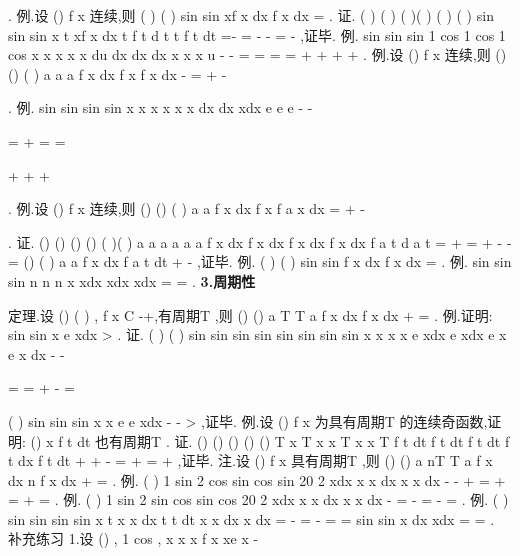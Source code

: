 . 
\textcolor{lyred}{例}.设
()
f x 连续,则
(
)
(
)
sin
sin
xf
x dx
f
x dx
\pi 
\pi 
\pi 
=
\int 
\int 
. 
证.
(
)
(
)
(
)(
)
(
)
(
)
sin
sin
sin
x
t
xf
x dx
t f
t d
t
t f
t dt
\pi 
\pi 
\pi 
\pi 
\pi 
\pi 
\pi 
=-
=
-
-
=
-
\int 
\int 
\int 
,证毕. 
\textcolor{lyred}{例}.
sin
sin
sin
1 cos
1 cos
1 cos
x
x
x
x
x
du
dx
dx
dx
x
x
x
u
\pi 
\pi 
\pi 
\pi 
\pi 
\pi 
\pi 
-
-
=
=
=
=
+
+
+
+
\int 
\int 
\int 
\int 
. 
\textcolor{lyred}{例}.设
()
f x 连续,则
()
()
(
)
a
a
a
f x dx
f x
f
x
dx
-
=
+
-




\int 
\int 
. 
\textcolor{lyred}{例}.
sin
sin
sin
sin
x
x
x
x
x
x
dx
dx
xdx
e
e
e
\pi 
\pi 
\pi 
\pi 
\pi 
-
-


=
+
=
=


+
+
+


\int 
\int 
\int 
. 
\textcolor{lyred}{例}.设
()
f x 连续,则
()
()
(
)
a
a
f x dx
f x
f a
x
dx
=
+
-




\int 
\int 
. 
证.
()
()
()
()
(
)(
)
a
a
a
a
a
a
f x dx
f x dx
f x dx
f x dx
f a
t d a
t
=
+
=
+
-
-
=
\int 
\int 
\int 
\int 
\int 
()
(
)
a
a
f x dx
f a
t dt
+
-
\int 
\int 
,证毕. 
\textcolor{lyred}{例}.
(
)
(
)
sin
sin
f
x dx
f
x dx
\pi 
\pi 
=
\int 
\int 
. 
\textcolor{lyred}{例}.
sin
sin
sin
n
n
n
x
xdx
xdx
xdx
\pi 
\pi 
\pi 
\pi 
\pi 
=
=
\int 
\int 
\int 
. 
{\bfseries \textcolor{lyred}{3.周期性}}

\textcolor{lyred}{定理}.设
()
(
)
,
f x
C
\in 
-\infty +\infty ,有周期T ,则
()
()
a T
T
a
f x dx
f x dx
+
=
\int 
\int 
. 
\textcolor{lyred}{例}.证明:
sin
sin
x
e
xdx
\pi 
>
\int 
. 
证.
(
)
(
)
sin
sin
sin
sin
sin
sin
sin
sin
x
x
x
x
e
xdx
e
xdx
e
x
e
x
dx
\pi 
\pi 
\pi 
\pi 
-
-


=
=
+
-
=


\int 
\int 
\int 
(
)
sin
sin
sin
x
x
e
e
xdx
\pi 
-
-
>
\int 
,证毕. 
\textcolor{lyred}{例}.设
()
f x 为具有周期T 的连续奇函数,证明:
()
x
f t dt
\int 
也有周期T . 
证.
()
()
()
()
()
T
x T
x
x T
x
x
T
f t dt
f t dt
f t dt
f t dx
f t dt
+
+
-
=
+
=
+
\int 
\int 
\int 
\int 
\int 
,证毕. 
\textcolor{lyred}{注}.设
()
f x 具有周期T ,则
()
()
a nT
T
a
f x dx
n
f x dx
+
=
\int 
\int 
. 
\textcolor{lyred}{例}.
(
)
1 sin 2
cos
sin
cos
sin
20 2
xdx
x
x dx
x
x dx
\pi 
\pi 
\pi 
\pi 
\pi 
-
-
+
=
+
=
+
=
\int 
\int 
\int 
. 
\textcolor{lyred}{例}.
(
)
1 sin 2
sin
cos
sin
cos
20 2
xdx
x
x dx
x
x dx
\pi 
\pi 
\pi 
\pi 
\pi 
-
=
-
=
-
=
\int 
\int 
\int 
. 
\textcolor{lyred}{例}.
(
)
sin
sin
sin
sin
x
t
x
x dx
t
t dt
x
x dx
x dx
\pi 
\pi 
\pi 
\pi 
\pi 
\pi 
\pi 
=
-
=
-
\Rightarrow 
=
=
\int 
\int 
\int 
\int 
sin
sin
x dx
xdx
\pi 
\pi 
\pi 
\pi 
\pi 
=
=
\int 
\int 
. 
\textcolor{lyred}{补充练习 }
1.设
()
,
1 cos
,
x
x
x
f x
xe
x
-

